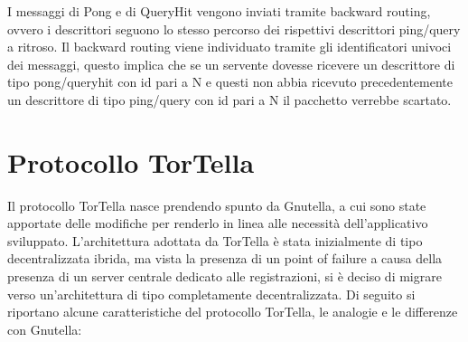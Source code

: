 I messaggi di Pong e di QueryHit vengono inviati tramite backward routing, ovvero i descrittori seguono lo stesso percorso dei rispettivi descrittori ping/query a ritroso. Il backward routing viene individuato tramite gli identificatori univoci dei messaggi, questo implica che se un servente dovesse ricevere un descrittore di tipo pong/queryhit con id pari a N e questi non abbia ricevuto precedentemente un descrittore di tipo ping/query con id pari a N il pacchetto verrebbe scartato.
\section{Protocollo TorTella}
Il protocollo TorTella nasce prendendo spunto da Gnutella, a cui sono state apportate delle modifiche per renderlo in linea alle necessità dell’applicativo sviluppato. L’architettura adottata da TorTella è stata inizialmente di tipo decentralizzata ibrida, ma vista la presenza di un point of failure a causa della presenza di un server centrale dedicato alle registrazioni, si è deciso di migrare verso un’architettura di tipo completamente decentralizzata. 
Di seguito si riportano alcune caratteristiche del protocollo TorTella, le analogie e le differenze con Gnutella:
